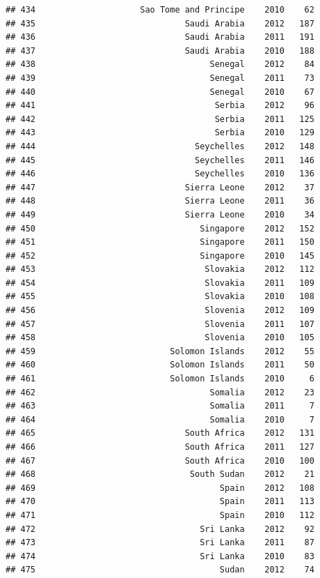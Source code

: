 \documentclass[
]{book}
\begin{document}
\begin{verbatim}
## 434                     Sao Tome and Principe    2010    62
## 435                              Saudi Arabia    2012   187
## 436                              Saudi Arabia    2011   191
## 437                              Saudi Arabia    2010   188
## 438                                   Senegal    2012    84
## 439                                   Senegal    2011    73
## 440                                   Senegal    2010    67
## 441                                    Serbia    2012    96
## 442                                    Serbia    2011   125
## 443                                    Serbia    2010   129
## 444                                Seychelles    2012   148
## 445                                Seychelles    2011   146
## 446                                Seychelles    2010   136
## 447                              Sierra Leone    2012    37
## 448                              Sierra Leone    2011    36
## 449                              Sierra Leone    2010    34
## 450                                 Singapore    2012   152
## 451                                 Singapore    2011   150
## 452                                 Singapore    2010   145
## 453                                  Slovakia    2012   112
## 454                                  Slovakia    2011   109
## 455                                  Slovakia    2010   108
## 456                                  Slovenia    2012   109
## 457                                  Slovenia    2011   107
## 458                                  Slovenia    2010   105
## 459                           Solomon Islands    2012    55
## 460                           Solomon Islands    2011    50
## 461                           Solomon Islands    2010     6
## 462                                   Somalia    2012    23
## 463                                   Somalia    2011     7
## 464                                   Somalia    2010     7
## 465                              South Africa    2012   131
## 466                              South Africa    2011   127
## 467                              South Africa    2010   100
## 468                               South Sudan    2012    21
## 469                                     Spain    2012   108
## 470                                     Spain    2011   113
## 471                                     Spain    2010   112
## 472                                 Sri Lanka    2012    92
## 473                                 Sri Lanka    2011    87
## 474                                 Sri Lanka    2010    83
## 475                                     Sudan    2012    74

\end{verbatim}
\end{document}
